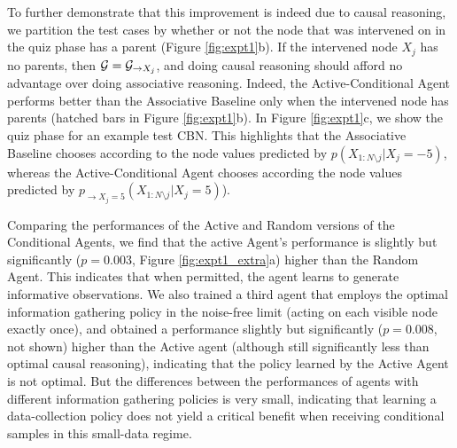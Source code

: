 To further demonstrate that this improvement is indeed due to causal reasoning, we partition the test cases by whether or not the node that was intervened on in the quiz phase has a parent (Figure \ref{fig:expt1}b). If the intervened node $X_j$ has no parents, then ${\cal G}  = {\cal G}_{\rightarrow X_j}$, and doing causal reasoning should afford no advantage over doing associative reasoning. Indeed, the Active-Conditional Agent performs better than the Associative Baseline only when the intervened node has parents (hatched bars in Figure \ref{fig:expt1}b). In Figure \ref{fig:expt1}c, we show the quiz phase for an example test CBN. This highlights that the Associative Baseline chooses according to the node values predicted by \(p(X_{1:N\setminus j }|X_j=-5)\), whereas the Active-Conditional Agent chooses according the node values predicted by \(p_{\rightarrow X_j=5}(X_{1:N\setminus j }|X_j=5)\)). 



 Comparing the performances of the Active and Random versions of the Conditional Agents, we find that the active Agent's performance is slightly but significantly ($p = 0.003$, Figure \ref{fig:expt1_extra}a) higher than the Random Agent. This indicates that when permitted, the agent learns to generate informative observations. We also trained a third agent that employs the optimal information gathering policy in the noise-free limit (acting on each visible node exactly once), and obtained a performance slightly but significantly ($p=0.008$, not shown) higher than the Active agent (although still significantly less than optimal causal reasoning), indicating that the policy learned by the Active Agent is not optimal. But the differences between the performances of agents with different information gathering policies is very small, indicating that learning a data-collection policy does not yield a critical benefit when receiving conditional samples in this small-data regime. 

